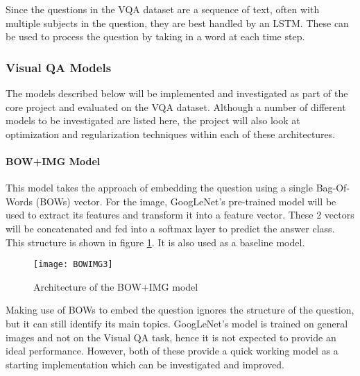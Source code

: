 \documentclass[12pt,a4paper,twoside]{article}
\begin{document}
Since the questions in the VQA dataset are a sequence of text, often with multiple subjects in the question, they are best handled by an LSTM. These can be used to process the question by taking in a word at each time step.

\subsubsection{Visual QA Models}\label{models}
The models described below will be implemented and investigated as part of the core project and evaluated on the VQA dataset. Although a number of different models to be investigated are listed here, the project will also look at optimization and regularization techniques within each of these architectures. 

\paragraph{BOW+IMG Model}\label{bowimg}

This model takes the approach of embedding the question using a single Bag-Of-Words (BOWs) vector. For the image, GoogLeNet's pre-trained model will be used to extract its features and transform it into a feature vector. These 2 vectors will be concatenated and fed into a softmax layer to predict the answer class. This structure is shown in figure \ref{fig:bowimg3}. It is also used as a baseline model.

\begin{figure}[h]
\centering
\texttt{[image: BOWIMG3]}
\caption{Architecture of the BOW+IMG model}
\label{fig:bowimg3}
\end{figure}
Making use of BOWs to embed the question ignores the structure of the question, but it can still identify its main topics. GoogLeNet's model is trained on general images and not on the Visual QA task, hence it is not expected to provide an ideal performance. However, both of these provide a quick working model as a starting implementation which can be investigated and improved.
\end{document}
